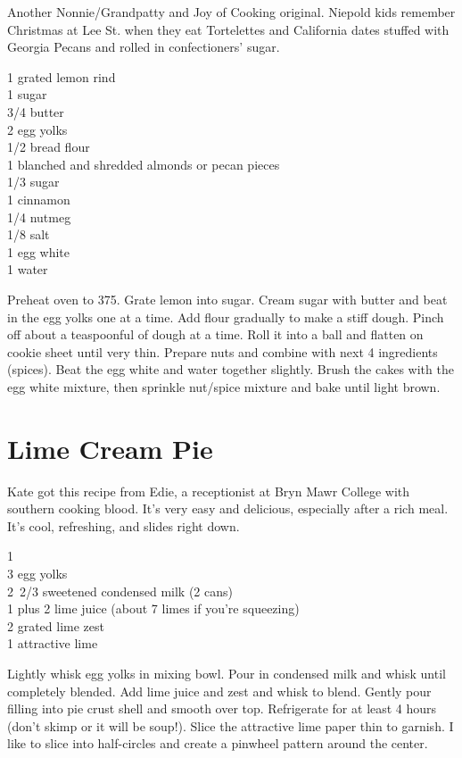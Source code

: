\begin{open}
  Another Nonnie/Grandpatty and Joy of Cooking original. Niepold kids
  remember Christmas at Lee St. when they eat Tortelettes and California dates
  stuffed with Georgia Pecans and rolled in confectioners' sugar.
\end{open}
\begin{ingredients}
  1 grated lemon rind\\
  \SI{1}{\cup} sugar\\
  \SI{3/4}{\cup} butter\\
  2 egg yolks \\
  \SI{1/2}{\cup} bread flour \\
  \SI{1}{\cup} blanched and shredded almonds or pecan pieces \\
  \SI{1/3}{\cup} sugar \\
  \SI{1}{\teaspoon} cinnamon\\
  \SI{1/4}{\teaspoon} nutmeg\\
  \SI{1/8}{\teaspoon} salt\\
  1 egg white\\
  \SI{1}{\tblspoon} water
\end{ingredients}
Preheat oven to \SI{375}{\degreeF}. Grate lemon into sugar. Cream sugar with
butter and beat in the egg yolks one at a time. Add flour gradually to make a
stiff dough. Pinch off about a teaspoonful of dough at a time. Roll it into a
ball and flatten on cookie sheet until very thin. Prepare nuts and combine
with next 4 ingredients (spices). Beat the egg white and water together
slightly.  Brush the cakes with the egg white mixture, then sprinkle nut/spice
mixture and bake until light brown.

\section{Lime Cream Pie}

\begin{open}
  Kate got this recipe from Edie, a receptionist at Bryn Mawr College with
  southern cooking blood.  It's very easy and delicious, especially after a rich
  meal. It's cool, refreshing, and slides right down.
\end{open}
\begin{ingredients}
  1 \\
  3 egg yolks\\
  \SI{2/3}[2]{\cup} sweetened condensed milk (2 cans)\\
  \SI{1}{\cup} plus \SI{2}{\tblspoon} lime juice (about 7 limes if you're
  squeezing)\\
  \SI{2}{\teaspoon} grated lime zest\\
  1 attractive lime
\end{ingredients}
Lightly whisk egg yolks in mixing bowl. Pour in condensed milk and whisk until
completely blended.  Add lime juice and zest and whisk to blend. Gently pour
filling into pie crust shell and smooth over top.  Refrigerate for at least 4
hours (don't skimp or it will be soup!). Slice the attractive lime paper thin
to garnish. I like to slice into half-circles and create a pinwheel pattern
around the center.
